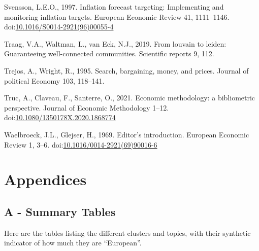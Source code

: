 \documentclass[]{elsarticle} %
\newlength{\cslhangindent}
\newlength{\cslentryspacingunit} %
\newenvironment{CSLReferences}[2] %
 {%
  \setlength{\parindent}{0pt}
  \ifodd #1
  \let\oldpar\par
  \def\par{\hangindent=\cslhangindent\oldpar}
  \fi
  \setlength{\parskip}{#2\cslentryspacingunit}
 }%
 {}
\begin{document}
\begin{CSLReferences}{1}{0}
\leavevmode{}%
Svensson, L.E.O., 1997. Inflation forecast targeting: {Implementing} and
monitoring inflation targets. European Economic Review 41, 1111--1146.
doi:\href{https://doi.org/10.1016/S0014-2921(96)00055-4}{10.1016/S0014-2921(96)00055-4}

\leavevmode{}%
Traag, V.A., Waltman, L., van Eck, N.J., 2019. From louvain to leiden:
Guaranteeing well-connected communities. Scientific reports 9, 112.

\leavevmode{}%
Trejos, A., Wright, R., 1995. Search, bargaining, money, and prices.
Journal of political Economy 103, 118--141.

\leavevmode{}%
Truc, A., Claveau, F., Santerre, O., 2021. Economic methodology: a
bibliometric perspective. Journal of Economic Methodology 1--12.
doi:\href{https://doi.org/10.1080/1350178X.2020.1868774}{10.1080/1350178X.2020.1868774}

\leavevmode{}%
Waelbroeck, J.L., Glejser, H., 1969. Editor's introduction. European
Economic Review 1, 3--6.
doi:\href{https://doi.org/10.1016/0014-2921(69)90016-6}{10.1016/0014-2921(69)90016-6}

\end{CSLReferences}

\newpage

\hypertarget{appendices}{%
\section*{Appendices}\label{appendices}}

\hypertarget{a---summary-tables}{%
\subsection*{A - Summary Tables}\label{a---summary-tables}}

Here are the tables listing the different clusters and topics, with
their synthetic indicator of how much they are ``European''.
\end{document}
